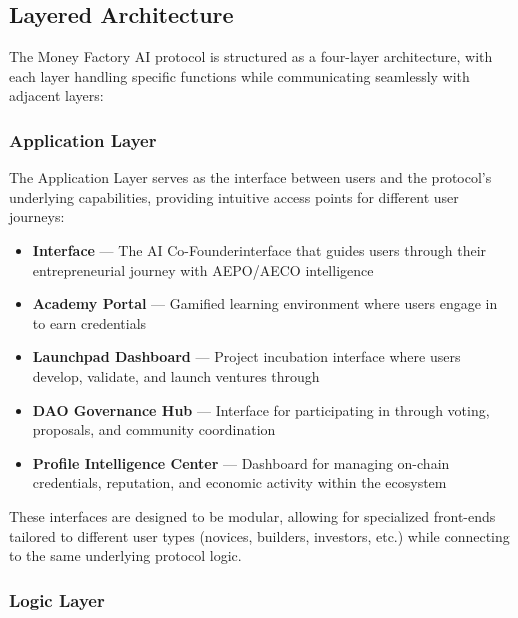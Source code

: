 \subsection{Layered Architecture}

The Money Factory AI protocol is structured as a four-layer architecture, with each layer handling specific functions while communicating seamlessly with adjacent layers:

\subsubsection*{Application Layer}

The Application Layer serves as the interface between users and the protocol's underlying capabilities, providing intuitive access points for different user journeys:

\begin{itemize}
    \item \textbf{ Interface} — The AI Co-Founder\texttrademark interface that guides users through their entrepreneurial journey with AEPO/AECO intelligence
    
    \item \textbf{Academy Portal} — Gamified learning environment where users engage in  to earn  credentials
    
    \item \textbf{Launchpad Dashboard} — Project incubation interface where users develop, validate, and launch ventures through 
    
    \item \textbf{DAO Governance Hub} — Interface for participating in  through voting, proposals, and community coordination
    
    \item \textbf{Profile Intelligence Center} — Dashboard for managing on-chain credentials, reputation, and economic activity within the ecosystem
\end{itemize}

These interfaces are designed to be modular, allowing for specialized front-ends tailored to different user types (novices, builders, investors, etc.) while connecting to the same underlying protocol logic.

\subsubsection*{Logic Layer}

